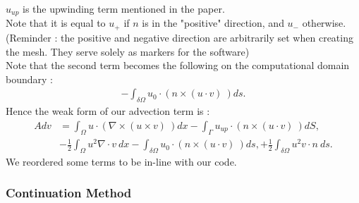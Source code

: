 \documentclass[11pt,twoside,a4paper]{article}
\begin{document}
$u_{up}$ is the upwinding term mentioned in the paper.\\
Note that it is equal to $u_+$ if $n$ is in the "positive" direction, and $u_-$ otherwise. (Reminder : the positive and negative direction are arbitrarily set when creating the mesh. They serve solely as markers for the software)\\
Note that the second term becomes the following on the computational domain boundary :
\begin{align*}
- \int_{\delta \Omega} u_0 \cdot (n \times (u \cdot v) \ ) ds .
\end{align*}
Hence the weak form of our advection term is :
\begin{align}
 Adv &= \int_\Omega u \cdot (\nabla \times (u \times v) \ ) dx - \int_{\Gamma} u_{up} \cdot (n \times (u \cdot v) \ ) dS , \\
&- \frac{1}{2} \int_\Omega u^2 \nabla \cdot v \ dx - \int_{\delta \Omega} u_0 \cdot (n \times (u \cdot v) \ ) ds ,
+ \frac{1}{2} \int_{\delta \Omega } u^2 v \cdot n \ ds .
\end{align}
We reordered some terms to be in-line with our code.

\subsubsection{Continuation Method}
\end{document}
